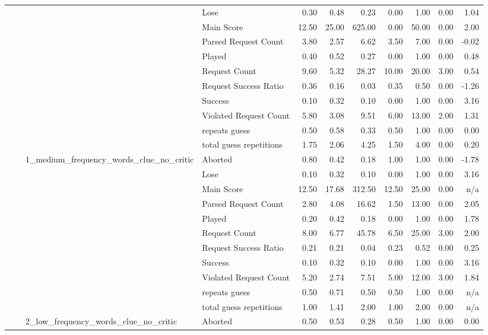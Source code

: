 \begin{tabular}{llllrrrrrrr}
 &  &  & Lose & 0.30 & 0.48 & 0.23 & 0.00 & 1.00 & 0.00 & 1.04 \\
 &  &  & Main Score & 12.50 & 25.00 & 625.00 & 0.00 & 50.00 & 0.00 & 2.00 \\
 &  &  & Parsed Request Count & 3.80 & 2.57 & 6.62 & 3.50 & 7.00 & 0.00 & -0.02 \\
 &  &  & Played & 0.40 & 0.52 & 0.27 & 0.00 & 1.00 & 0.00 & 0.48 \\
 &  &  & Request Count & 9.60 & 5.32 & 28.27 & 10.00 & 20.00 & 3.00 & 0.54 \\
 &  &  & Request Success Ratio & 0.36 & 0.16 & 0.03 & 0.35 & 0.50 & 0.00 & -1.26 \\
 &  &  & Success & 0.10 & 0.32 & 0.10 & 0.00 & 1.00 & 0.00 & 3.16 \\
 &  &  & Violated Request Count & 5.80 & 3.08 & 9.51 & 6.00 & 13.00 & 2.00 & 1.31 \\
 &  &  & repeats guess & 0.50 & 0.58 & 0.33 & 0.50 & 1.00 & 0.00 & 0.00 \\
 &  &  & total guess repetitions & 1.75 & 2.06 & 4.25 & 1.50 & 4.00 & 0.00 & 0.20 \\
\cline{3-11}
 &  & \multirow[t]{11}{*}{1_medium_frequency_words_clue_no_critic} & Aborted & 0.80 & 0.42 & 0.18 & 1.00 & 1.00 & 0.00 & -1.78 \\
 &  &  & Lose & 0.10 & 0.32 & 0.10 & 0.00 & 1.00 & 0.00 & 3.16 \\
 &  &  & Main Score & 12.50 & 17.68 & 312.50 & 12.50 & 25.00 & 0.00 & n/a \\
 &  &  & Parsed Request Count & 2.80 & 4.08 & 16.62 & 1.50 & 13.00 & 0.00 & 2.05 \\
 &  &  & Played & 0.20 & 0.42 & 0.18 & 0.00 & 1.00 & 0.00 & 1.78 \\
 &  &  & Request Count & 8.00 & 6.77 & 45.78 & 6.50 & 25.00 & 3.00 & 2.00 \\
 &  &  & Request Success Ratio & 0.21 & 0.21 & 0.04 & 0.23 & 0.52 & 0.00 & 0.25 \\
 &  &  & Success & 0.10 & 0.32 & 0.10 & 0.00 & 1.00 & 0.00 & 3.16 \\
 &  &  & Violated Request Count & 5.20 & 2.74 & 7.51 & 5.00 & 12.00 & 3.00 & 1.84 \\
 &  &  & repeats guess & 0.50 & 0.71 & 0.50 & 0.50 & 1.00 & 0.00 & n/a \\
 &  &  & total guess repetitions & 1.00 & 1.41 & 2.00 & 1.00 & 2.00 & 0.00 & n/a \\
\cline{3-11}
 &  & \multirow[t]{11}{*}{2_low_frequency_words_clue_no_critic} & Aborted & 0.50 & 0.53 & 0.28 & 0.50 & 1.00 & 0.00 & 0.00 \\

\end{tabular}
